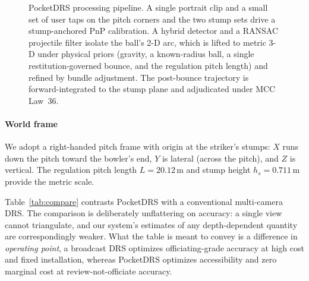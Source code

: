 \documentclass[journal]{IEEEtran}
\begin{document}
\begin{figure}[!t]
{%
}
\caption{PocketDRS processing pipeline. A single portrait clip and a small set
of user taps on the pitch corners and the two stump sets drive a stump-anchored
PnP calibration. A hybrid detector and a RANSAC projectile filter isolate the
ball's 2-D arc, which is lifted to metric 3-D under physical priors (gravity, a
known-radius ball, a single restitution-governed bounce, and the regulation
pitch length) and refined by bundle adjustment. The post-bounce trajectory is
forward-integrated to the stump plane and adjudicated under MCC Law~36.}
\label{fig:pipeline}
\end{figure}

\paragraph*{World frame} We adopt a right-handed pitch frame with origin at the
striker's stumps: $X$ runs down the pitch toward the bowler's end, $Y$ is
lateral (across the pitch), and $Z$ is vertical. The regulation pitch length
$L=20.12$\,m and stump height $h_s=0.711$\,m provide the metric scale.

Table~\ref{tab:compare} contrasts PocketDRS with a conventional multi-camera
DRS. The comparison is deliberately unflattering on accuracy: a single view
cannot triangulate, and our system's estimates of any depth-dependent quantity
are correspondingly weaker. What the table is meant to convey is a difference in
\emph{operating point}, a broadcast DRS optimizes officiating-grade accuracy at
high cost and fixed installation, whereas PocketDRS optimizes accessibility and
zero marginal cost at review-not-officiate accuracy.
\end{document}
